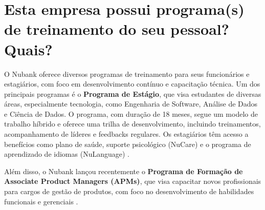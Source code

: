 \section{Esta empresa possui programa(s) de treinamento do seu pessoal? Quais?}

O Nubank oferece diversos programas de treinamento para seus funcionários e estagiários, com foco em desenvolvimento contínuo e capacitação técnica. Um dos principais programas é o \textbf{Programa de Estágio}, que visa estudantes de diversas áreas, especialmente tecnologia, como Engenharia de Software, Análise de Dados e Ciência de Dados. O programa, com duração de 18 meses, segue um modelo de trabalho híbrido e oferece uma trilha de desenvolvimento, incluindo treinamentos, acompanhamento de líderes e feedbacks regulares. Os estagiários têm acesso a benefícios como plano de saúde, suporte psicológico (NuCare) e o programa de aprendizado de idiomas (NuLanguage) \cite{epocanegocios2024, nubankcarreiras2024}.

Além disso, o Nubank lançou recentemente o \textbf{Programa de Formação de Associate Product Managers (APMs)}, que visa capacitar novos profissionais para cargos de gestão de produtos, com foco no desenvolvimento de habilidades funcionais e gerenciais \cite{nubankapm2024}.

